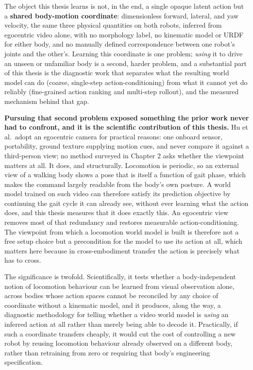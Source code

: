 \documentclass[12pt,a4paper,oneside]{report}
\begin{document}
The object this thesis learns is not, in the end, a single opaque latent action but a
\textbf{shared body-motion coordinate}: dimensionless forward, lateral, and yaw velocity, the same three physical
quantities on both robots, inferred from egocentric video alone, with no morphology label, no kinematic model or
URDF for either body, and no manually defined correspondence between one robot's joints and the other's. Learning
this coordinate is one problem; \emph{using} it to drive an unseen or unfamiliar body is a second, harder problem,
and a substantial part of this thesis is the diagnostic work that separates what the resulting world model can
do (coarse, single-step action-conditioning) from what it cannot yet do reliably (fine-grained action ranking and
multi-step rollout), and the measured mechanism behind that gap.

\textbf{Pursuing that second problem exposed something the prior work never had to confront, and it is the
scientific contribution of this thesis.} Hu et al.\ adopt an egocentric camera for practical reasons: one
onboard sensor, portability, ground texture supplying motion cues, and never compare it against a third-person
view; no method surveyed in Chapter 2 asks whether the viewpoint matters at all. It does, and structurally.
Locomotion is periodic, so an external view of a walking body shows a pose that is itself a function of gait
phase, which makes the command largely readable from the body's own posture. A world model trained on such video
can therefore satisfy its prediction objective by continuing the gait cycle it can already see, without ever
learning what the action does, and this thesis measures that it does exactly this. An egocentric view removes
most of that redundancy and restores measurable action-conditioning. The viewpoint from which a locomotion world
model is built is therefore not a free setup choice but a precondition for the model to use its action at all,
which matters here because in cross-embodiment transfer the action is precisely what has to cross.

The significance is twofold. Scientifically, it tests whether a body-independent notion of locomotion behaviour
can be learned from visual observation alone, across bodies whose action spaces cannot be reconciled by any
choice of coordinate without a kinematic model, and it produces, along the way, a diagnostic methodology for
telling whether a video world model is \emph{using} an inferred action at all rather than merely being able to
decode it. Practically, if such a coordinate transfers cheaply, it would cut the cost of controlling a new robot
by reusing locomotion behaviour already observed on a different body, rather than retraining from zero or
requiring that body's engineering specification.
\end{document}
